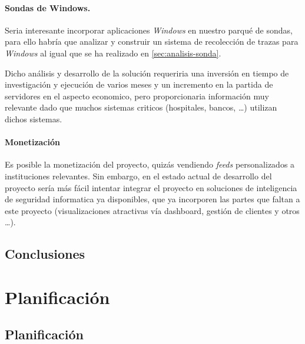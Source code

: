 \subsubsection{Sondas de Windows.}

Seria interesante incorporar aplicaciones \emph{Windows} en nuestro parqué de sondas, para ello habría que analizar y construir un sistema de recolección de trazas
para \emph{Windows} al igual que se ha realizado en \ref{sec:analisis-sonda}.

Dicho análisis y desarrollo de la solución requeriria una inversión en tiempo de investigación y ejecución de varios meses y un incremento en la partida de servidores en el aspecto economico, 
pero proporcionaria información muy relevante dado que muchos sistemas criticos (hospitales, bancos, \ldots) utilizan dichos sistemas.


\subsubsection{Monetización}

Es posible la monetización del proyecto, quizás vendiendo \emph{feeds} personalizados a instituciones relevantes. Sin embargo, en el estado actual de desarrollo del proyecto
sería más fácil intentar integrar el proyecto en soluciones de inteligencia de seguridad informatica ya disponibles, que ya incorporen las partes que faltan a este proyecto
(visualizaciones atractivas vía dashboard, gestión de clientes y otros \ldots).


\section{Conclusiones}




\chapter{Planificación}
\section{Planificación}




